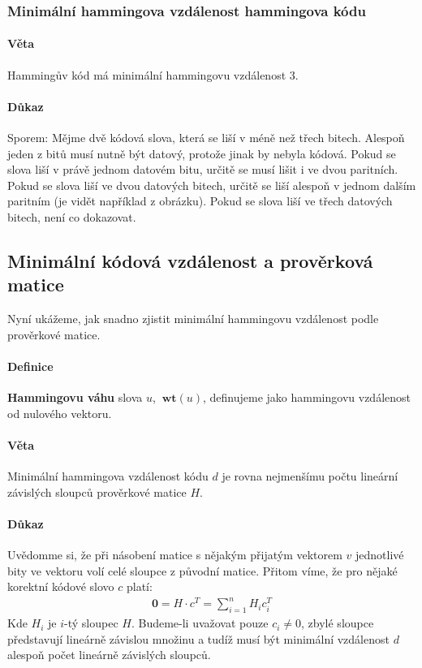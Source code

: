 \documentclass[a4paper,12pt]{article}
\newcommand{\wt}{\ \mathbf{wt}}
\begin{document}
\subsubsection{Minimální hammingova vzdálenost hammingova kódu}
\paragraph{Věta}
Hammingův kód má minimální hammingovu vzdálenost 3.
\paragraph{Důkaz}
Sporem: Mějme dvě kódová slova, která se liší v méně než třech bitech. Alespoň 
jeden z bitů musí nutně být datový, protože jinak by nebyla kódová. Pokud se 
slova liší v právě jednom datovém bitu, určitě se musí lišit i ve dvou 
paritních. Pokud se slova liší ve dvou datových bitech, určitě se liší alespoň v 
jednom dalším paritním (je vidět například z obrázku). Pokud se slova liší ve 
třech datových bitech, není co dokazovat.

\subsection{Minimální kódová vzdálenost a prověrková matice}
Nyní ukážeme, jak snadno zjistit minimální hammingovu vzdálenost podle 
prověrkové matice.
\paragraph{Definice}
\textbf{Hammingovu váhu} slova $u$, $\wt(u)$, definujeme jako hammingovu 
vzdálenost od nulového vektoru.
\paragraph{Věta}
Minimální hammingova vzdálenost kódu $d$ je rovna nejmenšímu počtu lineární 
závislých sloupců prověrkové matice $H$.
\paragraph{Důkaz}
Uvědomme si, že při násobení matice s nějakým přijatým vektorem $v$ jednotlivé 
bity ve vektoru volí celé sloupce z původní matice. Přitom víme, že pro nějaké 
korektní kódové slovo $c$ platí:
\begin{align}
	\mathbf{0} = H \cdot c^T = \sum_{i=1}^n H_i c_i^T
\end{align}
Kde $H_i$ je $i$-tý sloupec $H$. Budeme-li uvažovat pouze $c_i \neq 0$, zbylé 
sloupce představují lineárně závislou množinu a tudíž musí být minimální 
vzdálenost $d$ alespoň počet lineárně závislých sloupců.
\end{document}
